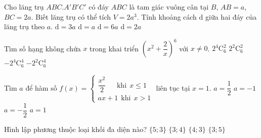 \begin{ex}%
	Cho lăng trụ $ABC.A'B'C'$ có đáy $ABC$ là tam giác vuông cân tại $B$, $AB=a$, $BC=2a$. Biết lăng trụ có thể tích $V=2a^3$. Tính khoảng cách $\mathrm d$ giữa hai đáy của lăng trụ theo $a$.
	\choice
	{$\mathrm d=3a$}
	{$\mathrm d=a$}
	{$\mathrm d=6a$}
	{\True $\mathrm d=2a$}
\end{ex}
\begin{ex}%
	Tìm số hạng không chứa $x$ trong khai triển $\left( x^2+\dfrac{2}{x}\right)^6$ với $x\ne 0$.
	\choice
	{\True $2^4\mathrm C_{6}^2$}
	{$2^2\mathrm C_{6}^2$}
	{$-2^4\mathrm C_{6}^4$}
	{$-2^2\mathrm C_{6}^4$}
\end{ex}
\begin{ex}%
	Tìm  $a$ để hàm số $f(x)=\left\{\begin{array}{l} \dfrac{x^2}{2}\ \ \ \ \ \ \ \text{khi} \ \ x\le1 \\ ax+1 \ \ \text{khi} \ \ x>1\end{array} \right.$ liên tục tại $x=1$.
	\choice
	{$a=\dfrac{1}{2}$}
	{$a=-1$}
	{\True $a=-\dfrac{1}{2}$}
	{$a=1$}
\end{ex}
\begin{ex}%
	Hình lập phương thuộc loại khối đa diện nào?
	\choice
	{$\{5;3\}$}
	{$\{3;4\}$}
	{\True $\{4;3\}$}
	{$\{3;5\}$}
\end{ex}
